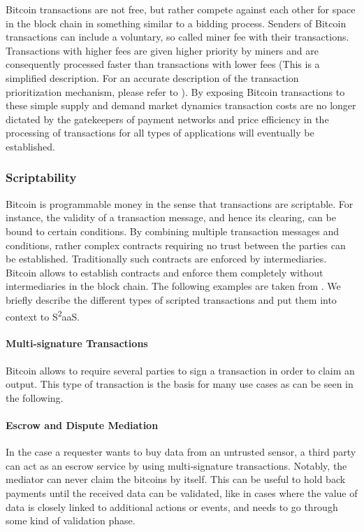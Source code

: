 Bitcoin transactions are not free, but rather compete against each other for space in the block chain in something similar to a bidding process. Senders of Bitcoin transactions can include a voluntary, so called miner fee with their transactions. Transactions with higher fees are given higher priority by miners and are consequently processed faster than transactions with lower fees (This is a simplified description. For an accurate description of the transaction prioritization mechanism, please refer to \cite{bitcoinwiki, nakamoto2008bitcoin}). By exposing Bitcoin transactions to these simple supply and demand market dynamics transaction costs are no longer dictated by the gatekeepers of payment networks and price efficiency in the processing of transactions for all types of applications will eventually be established.

\subsubsection{Scriptability}
\label{subsec:script}

Bitcoin is programmable money in the sense that transactions are scriptable. For instance, the validity of a transaction message, and hence its clearing, can be bound to certain conditions. By combining multiple transaction messages and conditions, rather complex contracts requiring no trust between the parties can be established. Traditionally such contracts are enforced by intermediaries. Bitcoin allows to establish contracts and enforce them completely without intermediaries in the block chain. The following examples are taken from \cite{smartcontr}. We briefly describe the different types of scripted transactions and put them into context to S\textsuperscript{2}aaS.

\paragraph{Multi-signature Transactions}
Bitcoin allows to require several parties to sign a transaction in order to claim an output. This type of transaction is the basis for many use cases as can be seen in the following.
\paragraph{Escrow and Dispute Mediation}
In the case a requester wants to buy data from an untrusted sensor, a third party can act as an escrow service by using multi-signature transactions. Notably, the mediator can never claim the bitcoins by itself. This can be useful to hold back payments until the received data can be validated, like in cases where the value of data is closely linked to additional actions or events, and needs to go through some kind of validation phase. 
